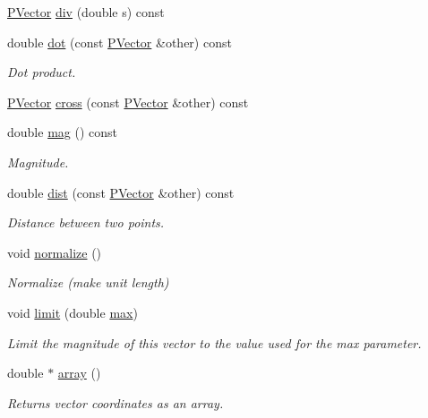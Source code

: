 \begin{DoxyCompactItemize}
\hyperlink{classcprocessing_1_1PVector}{\-P\-Vector} \hyperlink{classcprocessing_1_1PVector_ae65adb6c978c1a498d071dc19656e8af}{div} (double s) const 
\item 
double \hyperlink{classcprocessing_1_1PVector_a75f71674d4bc6fac4c1f54f66238450d}{dot} (const \hyperlink{classcprocessing_1_1PVector}{\-P\-Vector} \&other) const 
\begin{DoxyCompactList}\small\item\em \-Dot product. \end{DoxyCompactList}\item 
\hyperlink{classcprocessing_1_1PVector}{\-P\-Vector} \hyperlink{classcprocessing_1_1PVector_a445f3128b72f77a9c93a7b3755125c6b}{cross} (const \hyperlink{classcprocessing_1_1PVector}{\-P\-Vector} \&other) const 
\item 
double \hyperlink{classcprocessing_1_1PVector_af9d951dc62610be214e933548224c191}{mag} () const 
\begin{DoxyCompactList}\small\item\em \-Magnitude. \end{DoxyCompactList}\item 
double \hyperlink{classcprocessing_1_1PVector_afd5125d0b45ddc5c4ffdb5a82d2644a5}{dist} (const \hyperlink{classcprocessing_1_1PVector}{\-P\-Vector} \&other) const 
\begin{DoxyCompactList}\small\item\em \-Distance between two points. \end{DoxyCompactList}\item 
void \hyperlink{classcprocessing_1_1PVector_aed64120e52ca58b21e910ca52b9afca0}{normalize} ()
\begin{DoxyCompactList}\small\item\em \-Normalize (make unit length) \end{DoxyCompactList}\item 
void \hyperlink{classcprocessing_1_1PVector_acbb61722faee9258fbb0bad9b47e0582}{limit} (double \hyperlink{namespacecprocessing_ab4e75c25cbada0bb5a001658f44783e6}{max})
\begin{DoxyCompactList}\small\item\em \-Limit the magnitude of this vector to the value used for the max parameter. \end{DoxyCompactList}\item 
double $\ast$ \hyperlink{classcprocessing_1_1PVector_a23aec6aff57e8528bf0322b8dcf024ec}{array} ()
\begin{DoxyCompactList}\small\item\em \-Returns vector coordinates as an array. \end{DoxyCompactList}\end{DoxyCompactItemize}
